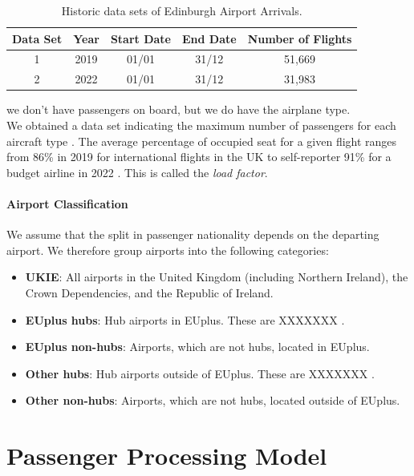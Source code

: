\documentclass[10pt]{article}
\begin{document}
\begin{table}[!ht]
\caption{Historic data sets of Edinburgh Airport Arrivals.}
\label{tab_comdat_overview}
\centering
\begin{tabular}{ccccc}
\hline
\multicolumn{1}{c}{\textbf{Data Set}} & \textbf{Year} & \textbf{Start Date} & \textbf{End Date} & \textbf{Number of Flights} \\ \hline
1  & 2019  & 01/01  & 31/12    &  51,669  \\
2  & 2022  & 01/01  & 31/12    &  31,983  \\
 \hline
\end{tabular}
\end{table}


we don't have passengers on board, but we do have the airplane type. \\
We obtained a data set indicating the maximum number of passengers for each aircraft type \cite{aircraft_capacity}. The average percentage of occupied seat for a given flight ranges from 86\% in 2019 for international flights in the UK \cite{loading_factor_national} to self-reporter 91\% for a budget airline in 2022 \cite{loading_factor_ryanair}. This is called the \textit{load factor}.

\paragraph{Airport Classification}
We assume that the split in passenger nationality depends on the departing airport. We therefore group airports into the following categories: 
\begin{itemize}
    \item \textbf{UKIE}: All airports in the United Kingdom (including Northern Ireland), the Crown Dependencies, and the Republic of Ireland.
    \item \textbf{EUplus hubs}: Hub airports in EUplus. These are XXXXXXX \cite{mega_hubs}.
    \item \textbf{EUplus non-hubs}: Airports, which are not hubs, located in EUplus.
    \item \textbf{Other hubs}: Hub airports outside of EUplus. These are XXXXXXX \cite{mega_hubs}.
    \item \textbf{Other non-hubs}: Airports, which are not hubs, located outside of EUplus.
\end{itemize}




\section{Passenger Processing Model}
\end{document}
